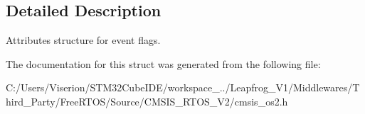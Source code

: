 \subsection{Detailed Description}
Attributes structure for event flags. 

The documentation for this struct was generated from the following file\+:\begin{DoxyCompactItemize}
\item 
C\+:/\+Users/\+Viserion/\+S\+T\+M32\+Cube\+I\+D\+E/workspace\+\_../\+Leapfrog\+\_\+\+V1/\+Middlewares/\+Third\+\_\+\+Party/\+Free\+R\+T\+O\+S/\+Source/\+C\+M\+S\+I\+S\+\_\+\+R\+T\+O\+S\+\_\+\+V2/cmsis\+\_\+os2.\+h\end{DoxyCompactItemize}
